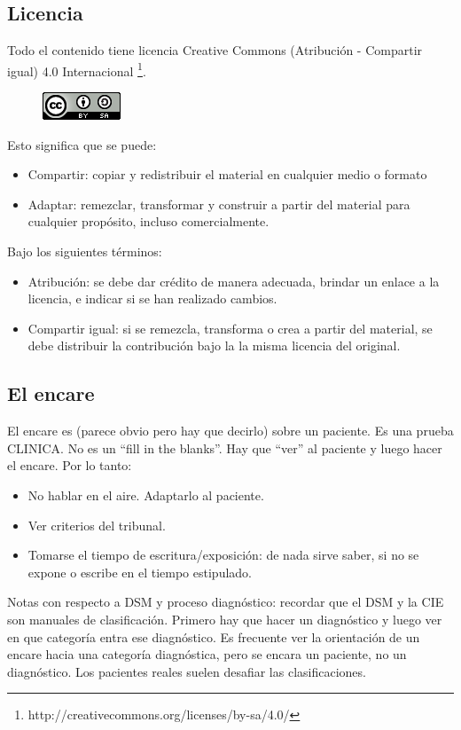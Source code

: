 \subsection*{Licencia}
Todo el contenido tiene licencia Creative Commons (Atribución - Compartir igual) 4.0 Internacional \footnote{http://creativecommons.org/licenses/by-sa/4.0/}.

\begin{figure}
	\centering
    \includegraphics{cc.png}
\end{figure}
Esto significa que se puede:
\begin{itemize}
\item Compartir: copiar y redistribuir el material en cualquier medio o formato
\item Adaptar: remezclar, transformar y construir a partir del material para cualquier propósito, incluso comercialmente.
\end{itemize}
Bajo los siguientes términos:
\begin{itemize}
	\item Atribución: se debe dar crédito de manera adecuada, brindar un enlace a la licencia, e indicar si se han realizado cambios.
	\item Compartir igual: si se remezcla, transforma o crea a partir del material, se debe distribuir la contribución bajo la la misma licencia del original.
\end{itemize}
\subsection*{El encare}
El encare es (parece obvio pero hay que decirlo) sobre un paciente. Es una prueba CLINICA. No es un ``fill in the blanks''. Hay que ``ver'' al paciente y luego hacer el encare. Por lo tanto:
\begin{itemize}
	\item No hablar en el aire. Adaptarlo al paciente.
	\item Ver criterios del tribunal.
	\item Tomarse el tiempo de escritura/exposición: de nada sirve saber, si no se expone o escribe en el tiempo estipulado.
\end{itemize}
Notas con respecto a DSM y proceso diagnóstico: recordar que el DSM y la CIE son manuales de clasificación. Primero hay que hacer un diagnóstico y luego ver en que categoría entra ese diagnóstico. Es frecuente ver la orientación de un encare hacia una categoría diagnóstica, pero se encara un paciente, no un diagnóstico. Los pacientes reales suelen desafiar las clasificaciones.

